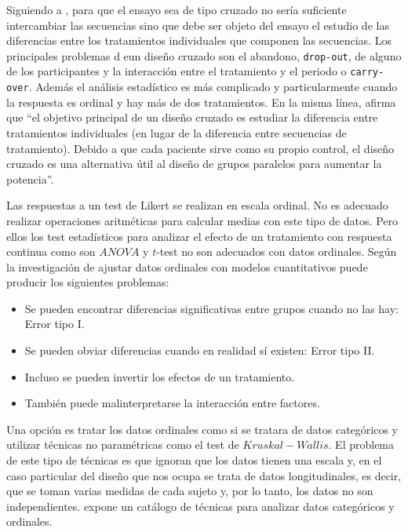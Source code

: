 \documentclass[
  12pt,
  a4paper,
  extrafontsizes,
  onecolumn,
  openright]{memoir}
\providecommand{\tightlist}{%
  \setlength{\itemsep}{0pt}\setlength{\parskip}{0pt}}\usepackage{longtable,booktabs,array}
\begin{document}
Siguiendo a \textcite{senn2022}, para que el ensayo sea de tipo cruzado
no sería suficiente intercambiar las secuencias sino que debe ser objeto
del ensayo el estudio de las diferencias entre los tratamientos
individuales que componen las secuencias. Los principales problemas d
eun diseño cruzado son el abandono, \texttt{drop-out}, de alguno de los
participantes y la interacción entre el tratamiento y el periodo o
\texttt{carry-over}. Además el análisis estadístico es más complicado y
particularmente cuando la respuesta es ordinal y hay más de dos
tratamientos. En la misma línea, \textcite{lui2016} afirma que
\enquote{el objetivo principal de un diseño cruzado es estudiar la
diferencia entre tratamientos individuales (en lugar de la diferencia
entre secuencias de tratamiento). Debido a que cada paciente sirve como
su propio control, el diseño cruzado es una alternativa útil al diseño
de grupos paralelos para aumentar la potencia}.

Las respuestas a un test de Likert se realizan en escala ordinal. No es
adecuado realizar operaciones aritméticas para calcular medias con este
tipo de datos. Pero ellos los test estadísticos para analizar el efecto
de un tratamiento con respuesta continua como son \(ANOVA\) y \(t\)-test
no son adecuados con datos ordinales. Según la investigación de
\textcite{kruschke20182018328} ajustar datos ordinales con modelos
cuantitativos puede producir los siguientes problemas:

\begin{itemize}
\tightlist
\item
  Se pueden encontrar diferencias significativas entre grupos cuando no
  las hay: Error tipo I.
\item
  Se pueden obviar diferencias cuando en realidad sí existen: Error tipo
  II.
\item
  Incluso se pueden invertir los efectos de un tratamiento.
\item
  También puede malinterpretarse la interacción entre factores.
\end{itemize}

Una opción es tratar los datos ordinales como si se tratara de datos
categóricos y utilizar técnicas no paramétricas como el test de
\(Kruskal-Wallis\). El problema de este tipo de técnicas es que ignoran
que los datos tienen una escala y, en el caso particular del diseño que
nos ocupa se trata de datos longitudinales, es decir, que se toman
varias medidas de cada sujeto y, por lo tanto, los datos no son
independientes. \textcite{agresti2010} expone un catálogo de técnicas
para analizar datos categóricos y ordinales.
\end{document}
